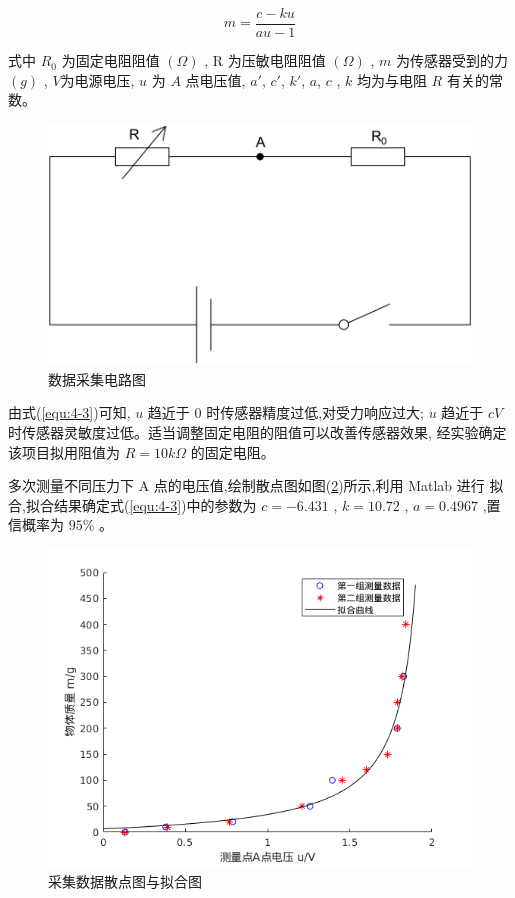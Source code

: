 \begin{equation}
  \label{equ:4-3}
  m = \frac{{c - ku}}{{au - 1}}
\end{equation}

式中 $R_0$ 为固定电阻阻值 $(\Omega )$ , R 为压敏电阻阻值 $(\Omega )$ ,
$m$ 为传感器受到的力 $(g)$ , $V$为电源电压, $u$ 为 $A$ 点电压值,
$a'$, $c'$, $k'$, $a$, $c$ , $k$ 均为与电阻 $R$ 有关的常数。

\begin{figure}[!ht]
  \centering
  \includegraphics[scale=0.3]{chapter04/pic/4-3}
  \caption{数据采集电路图}
  \label{fig:4-3}
  \vspace{-0.3cm}
\end{figure}

由式(\ref{equ:4-3})可知, $u$ 趋近于 0 时传感器精度过低,对受力响应过大;
$u$ 趋近于 $cV$ 时传感器灵敏度过低。适当调整固定电阻的阻值可以改善传感器效果,
经实验确定该项目拟用阻值为 $R=10k\Omega$ 的固定电阻。

多次测量不同压力下 A 点的电压值,绘制散点图如图(\ref{fig:4-4})所示,利用 Matlab 进行
拟合,拟合结果确定式(\ref{equ:4-3})中的参数为
$c = − 6.431$ , $ k = 10.72 $ , $a = 0.4967$ ,置信概率为 $95\%$ 。

\begin{figure}[!ht]
  \centering
  \includegraphics[scale=0.63]{chapter04/pic/4-4}
  \caption{采集数据散点图与拟合图}
  \label{fig:4-4}
  \vspace{-0.3cm}
\end{figure}

